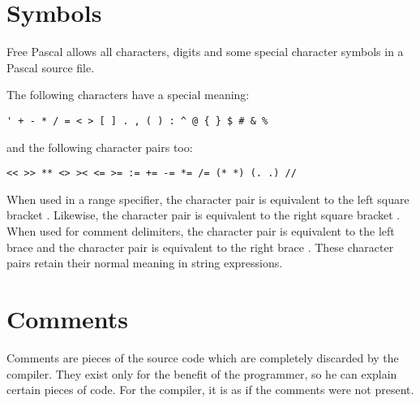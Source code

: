 \section{Symbols}
Free Pascal allows all characters, digits and some special character symbols
in a Pascal source file.

The following characters have a special meaning:
\begin{verbatim}
' + - * / = < > [ ] . , ( ) : ^ @ { } $ # & %
\end{verbatim}
and the following character pairs too:
\begin{verbatim}
<< >> ** <> >< <= >= := += -= *= /= (* *) (. .) //
\end{verbatim}
When used in a range specifier, the character pair  is equivalent to
the left square bracket \var{[}. Likewise, the character pair  is
equivalent to the right square bracket \var{]}.
When used for comment delimiters, the character pair \var{(*} is equivalent
to the  left brace \var{\{} and the character pair \var{*)} is equivalent
to the right brace \var{\}}.
These character pairs retain their normal meaning in string expressions.


\section{Comments}
Comments are pieces of the source code which are completely discarded by the
compiler. They exist only for the benefit of the programmer, so he can
explain certain pieces of code. For the compiler, it is as if the comments
were not present.

